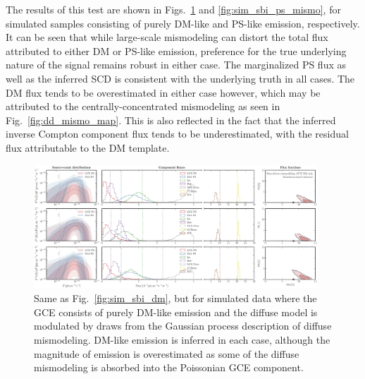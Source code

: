 \documentclass[prd,aps,10pt,nofootinbib,twocolumn,superscriptaddress,preprintnumbers,balancelastpage,longbibliography]{revtex4-1}
\begin{document}
The results of this test are shown in Figs.~\ref{fig:sim_sbi_dm_mismo} and \ref{fig:sim_sbi_ps_mismo}, for simulated samples consisting of purely DM-like and PS-like emission, respectively. It can be seen that while large-scale mismodeling can distort the total flux attributed to either DM or PS-like emission, preference for the true underlying nature of the signal remains robust in either case. The marginalized PS flux as well as the inferred SCD is consistent with the underlying truth in all cases. The DM flux tends to be overestimated in either case however, which may be attributed to the centrally-concentrated mismodeling as seen in Fig.~\ref{fig:dd_mismo_map}. This is also reflected in the fact that the inferred inverse Compton component flux tends to be underestimated, with the residual flux attributable to the DM template.  

%
\begin{figure}
    \centering
    \includegraphics[width=0.95\textwidth]{plots/sim_sbi_dm_mismo.pdf}
    \caption{Same as Fig.~\ref{fig:sim_sbi_dm}, but for simulated data where the GCE consists of purely DM-like emission and the diffuse model is modulated by draws from the Gaussian process description of diffuse mismodeling. DM-like emission is inferred in each case, although the magnitude of emission is overestimated as some of the diffuse mismodeling is absorbed into the Poissonian GCE component.}
    \label{fig:sim_sbi_dm_mismo}
\end{figure}
%
\end{document}
